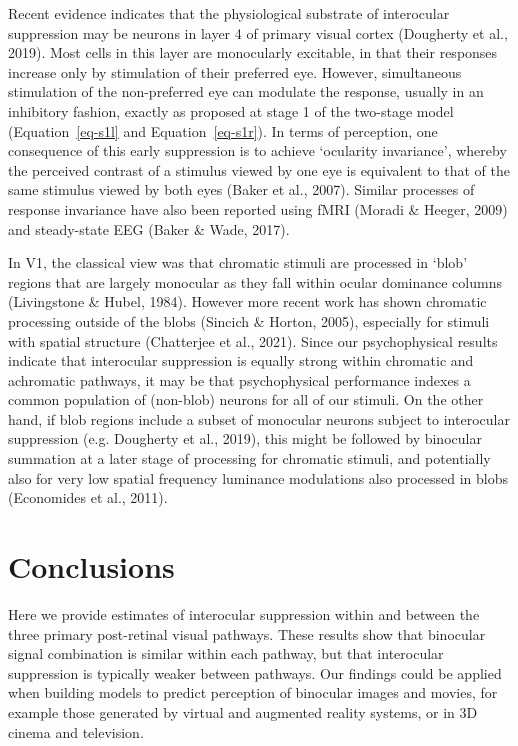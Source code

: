 \documentclass[
  letterpaper,
  DIV=11,
  numbers=noendperiod]{scrartcl}
\begin{document}
Recent evidence indicates that the physiological substrate of
interocular suppression may be neurons in layer 4 of primary visual
cortex (Dougherty et al., 2019). Most cells in this layer are
monocularly excitable, in that their responses increase only by
stimulation of their preferred eye. However, simultaneous stimulation of
the non-preferred eye can modulate the response, usually in an
inhibitory fashion, exactly as proposed at stage 1 of the two-stage
model (Equation~\ref{eq-s1l} and Equation~\ref{eq-s1r}). In terms of
perception, one consequence of this early suppression is to achieve
`ocularity invariance', whereby the perceived contrast of a stimulus
viewed by one eye is equivalent to that of the same stimulus viewed by
both eyes (Baker et al., 2007). Similar processes of response invariance
have also been reported using fMRI (Moradi \& Heeger, 2009) and
steady-state EEG (Baker \& Wade, 2017).

In V1, the classical view was that chromatic stimuli are processed in
`blob' regions that are largely monocular as they fall within ocular
dominance columns (Livingstone \& Hubel, 1984). However more recent work
has shown chromatic processing outside of the blobs (Sincich \& Horton,
2005), especially for stimuli with spatial structure (Chatterjee et al.,
2021). Since our psychophysical results indicate that interocular
suppression is equally strong within chromatic and achromatic pathways,
it may be that psychophysical performance indexes a common population of
(non-blob) neurons for all of our stimuli. On the other hand, if blob
regions include a subset of monocular neurons subject to interocular
suppression (e.g. Dougherty et al., 2019), this might be followed by
binocular summation at a later stage of processing for chromatic
stimuli, and potentially also for very low spatial frequency luminance
modulations also processed in blobs (Economides et al., 2011).

\section{Conclusions}\label{conclusions}

Here we provide estimates of interocular suppression within and between
the three primary post-retinal visual pathways. These results show that
binocular signal combination is similar within each pathway, but that
interocular suppression is typically weaker between pathways. Our
findings could be applied when building models to predict perception of
binocular images and movies, for example those generated by virtual and
augmented reality systems, or in 3D cinema and television.
\end{document}
